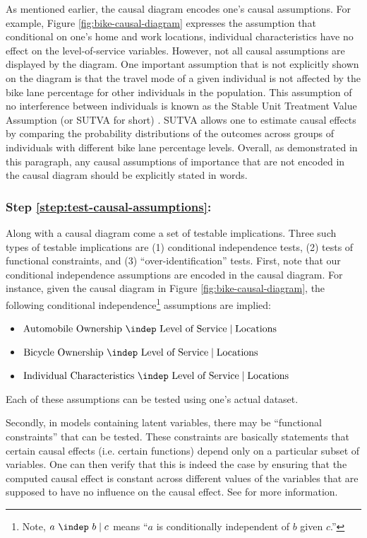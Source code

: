 As mentioned earlier, the causal diagram encodes one's causal assumptions. For example, Figure \ref{fig:bike-causal-diagram} expresses the assumption that conditional on one's home and work locations,  individual characteristics have no effect on the level-of-service variables. However, not all causal assumptions are displayed by the diagram. One important assumption that is not explicitly shown on the diagram is that the travel mode of a given individual is not affected by the bike lane percentage for other individuals in the population. This assumption of no interference between individuals is known as the Stable Unit Treatment Value Assumption (or SUTVA for short) \citep[p.~10]{imbens2015causal}. SUTVA allows one to estimate causal effects by comparing the probability distributions of the outcomes across groups of individuals with different bike lane percentage levels. Overall, as demonstrated in this paragraph, any causal assumptions of importance that are not encoded in the causal diagram should be explicitly stated in words.


\subsubsection*{Step \ref{step:test-causal-assumptions}:}
Along with a causal diagram come a set of testable implications. Three such types of testable implications are (1) conditional independence tests, (2) tests of functional constraints, and (3) ``over-identification'' tests. First, note that our conditional independence assumptions are encoded in the causal diagram. For instance, given the causal diagram in Figure \ref{fig:bike-causal-diagram}, the following conditional independence\footnote{Note, $a \  \indep \  b \mid c$ means ``$a$ is conditionally independent of $b$ given $c$.''} assumptions are implied:
\begin{itemize}
\item $\textrm{Automobile Ownership } \indep \textrm{  Level of Service} \mid \textrm{Locations}$

\item $\textrm{Bicycle Ownership } \indep \textrm{  Level of Service} \mid \textrm{Locations}$

\item $\textrm{Individual Characteristics } \indep \textrm{  Level of Service} \mid \textrm{Locations}$
\end{itemize}
Each of these assumptions can be tested using one's actual dataset.

Secondly, in models containing latent variables, there may be ``functional constraints'' that can be tested. These constraints are basically statements that certain causal effects (i.e. certain functions) depend only on a particular subset of variables. One can then verify that this is indeed the case by ensuring that the computed causal effect is constant across different values of the variables that are supposed to have no influence on the causal effect. See \citet{tian2002testable} for more information.

